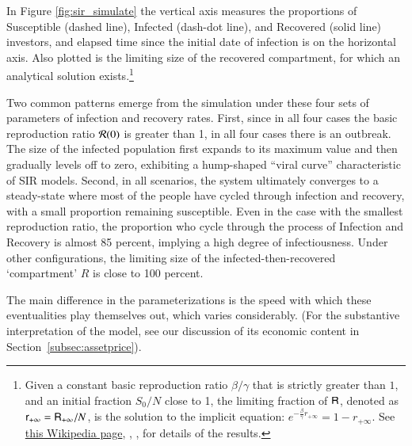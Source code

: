 In Figure \ref{fig:sir_simulate} the vertical axis measures the proportions of Susceptible (dashed line), Infected (dash-dot line), and Recovered (solid line) investors, and elapsed time since the initial date of infection is on the horizontal axis.  Also plotted is the limiting size of the recovered compartment, for which an analytical solution exists.\footnote{Given a constant basic reproduction ratio $\beta/\gamma$ that is strictly greater than $1$, and an initial fraction $S_{0}/N$ close to 1, the limiting fraction of $\mathsf{R}$, denoted as $\mathsf{r}_{+\infty} = \mathsf{R}_{+\infty}/N$, is the solution to the implicit equation: $e^{-\frac{\beta}{\gamma} r_{+\infty}} = 1-r_{+\infty}$.  See  \href{https://en.wikipedia.org/wiki/Compartmental_models_in_epidemiology\#Transition_rates}{this Wikipedia page}, \cite{harko2014exact}, \href{{https://iopscience.iop.org/article/10.1088/1751-8121/abc65d}}{\cite{kroger2020analytical}}, \cite{okabe2021microscopic} for details of the results.}

Two common patterns emerge from the simulation under these four sets of parameters of infection and recovery rates.  First, since in all four cases the basic reproduction ratio $\mathcal{R}(0)$ is greater than 1, in all four cases there is an outbreak. The size of the infected population first expands to its maximum value and then gradually levels off to zero, exhibiting a hump-shaped ``viral curve'' characteristic of SIR models.  Second, in all scenarios, the system ultimately converges to a steady-state where most of the people have cycled through infection and recovery, with a small proportion remaining susceptible. Even in the case with the smallest reproduction ratio, the proportion who cycle through the process of Infection and Recovery is almost 85 percent, implying a high degree of infectiousness. Under other configurations, the limiting size of the infected-then-recovered `compartment' $R$ is close to 100 percent.

The main difference in the parameterizations is the speed with which these eventualities play themselves out, which varies considerably.  (For the substantive interpretation of the model, see our discussion of its economic content in Section~\ref{subsec:assetprice}).


